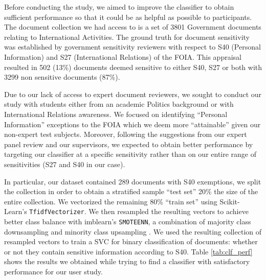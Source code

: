 \documentclass[\version]{l4proj}
\begin{document}
Before conducting the study, we aimed to improve the classifier to obtain sufficient performance so that it could be as helpful as possible to participants.
The document collection we had access to is a set of 3801 Government documents relating to International Activities.
The ground truth for document sensitivity was established by government sensitivity reviewers with respect to S40 (Personal Information) and S27 (International Relations) of the FOIA.
This appraisal resulted in 502 (13\%) documents deemed sensitive to either S40, S27 or both with 3299 non sensitive documents (87\%).

Due to our lack of access to expert document reviewers, we sought to conduct our study with students either from an academic Politics background or with International Relations awareness.
We focused on identifying ``Personal Information'' exceptions to the FOIA which we deem more ``attainable'' given our non-expert test subjects.
Moreover, following the suggestions from our expert panel review and our supervisors, we expected to obtain better performance by targeting our classifier at a specific sensitivity rather than on our entire range of sensitivities (S27 and S40 in our case).

In particular, our dataset contained 289 documents with S40 exemptions, we split the collection in order to obtain a stratified sample ``test set'' 20\% the size of the entire collection.
We vectorized the remaining 80\% ``train set'' using Scikit-Learn's \verb|TfidfVectorizer|.
We then resampled the resulting vectors to achieve better class balance with imblearn's \verb|SMOTEENN|, a combination of majority class downsampling and minority class upsampling \autocite{lemaitreImbalancedlearnPythonToolbox2017}.
We used the resulting collection of resampled vectors to train a SVC for binary classification of documents: whether or not they contain sensitive information according to S40.
Table \ref{tab:clf_perf} shows the results we obtained while trying to find a classifier with satisfactory performance for our user study.
\end{document}
